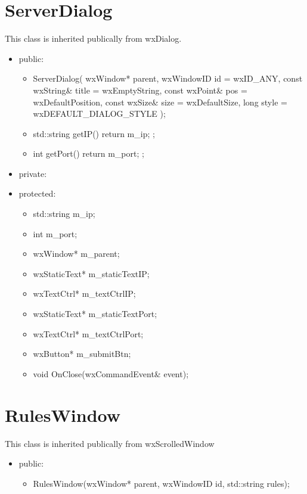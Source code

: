 \documentclass[]{scrartcl}
\begin{document}
\section{ServerDialog }
	This class is inherited publically from wxDialog.
	\begin{itemize}
	\item public:
	
	\begin{itemize}
		\item ServerDialog( wxWindow* parent, wxWindowID id = wxID\_ANY, const wxString\& title = wxEmptyString, const wxPoint\& pos = wxDefaultPosition, const wxSize\& size = wxDefaultSize, long style = wxDEFAULT\_DIALOG\_STYLE ); 

		\item std::string getIP() { return m\_ip; };

		\item int getPort() { return m\_port; };
	\end{itemize}
	
	\end{itemize}
	\begin{itemize}
		\item private:
		\item protected: 
		\begin{itemize}
			\item std::string m\_ip;
			\item	int m\_port;
			\item	wxWindow* m\_parent;
			\item	wxStaticText* m\_staticTextIP;
			\item	wxTextCtrl* m\_textCtrlIP;
			\item	wxStaticText* m\_staticTextPort;
			\item	wxTextCtrl* m\_textCtrlPort;
			\item	wxButton* m\_submitBtn;
			\item	void OnClose(wxCommandEvent\& event);
		\end{itemize}
	\end{itemize}
	
	


\section{RulesWindow }
	This class is inherited  publically from wxScrolledWindow

	\begin{itemize}
		\item 	public:
		\begin{itemize}
			\item RulesWindow(wxWindow* parent, wxWindowID id, std::string rules);
		\end{itemize}
	\end{itemize}
\end{document}
